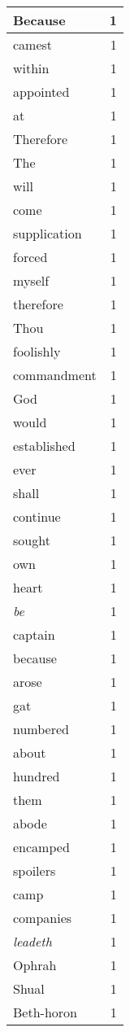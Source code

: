 \begin{center}
\begin{longtable}{l|r}
Because & 1 \\ \hline
camest & 1 \\ \hline
within & 1 \\ \hline
appointed & 1 \\ \hline
at & 1 \\ \hline
Therefore & 1 \\ \hline
The & 1 \\ \hline
will & 1 \\ \hline
come & 1 \\ \hline
supplication & 1 \\ \hline
forced & 1 \\ \hline
myself & 1 \\ \hline
therefore & 1 \\ \hline
Thou & 1 \\ \hline
foolishly & 1 \\ \hline
commandment & 1 \\ \hline
God & 1 \\ \hline
would & 1 \\ \hline
established & 1 \\ \hline
ever & 1 \\ \hline
shall & 1 \\ \hline
continue & 1 \\ \hline
sought & 1 \\ \hline
own & 1 \\ \hline
heart & 1 \\ \hline
\emph{be} & 1 \\ \hline
captain & 1 \\ \hline
because & 1 \\ \hline
arose & 1 \\ \hline
gat & 1 \\ \hline
numbered & 1 \\ \hline
about & 1 \\ \hline
hundred & 1 \\ \hline
them & 1 \\ \hline
abode & 1 \\ \hline
encamped & 1 \\ \hline
spoilers & 1 \\ \hline
camp & 1 \\ \hline
companies & 1 \\ \hline
\emph{leadeth} & 1 \\ \hline
Ophrah & 1 \\ \hline
Shual & 1 \\ \hline
Beth-horon & 1 \\ \hline

\end{longtable}
\end{center}
